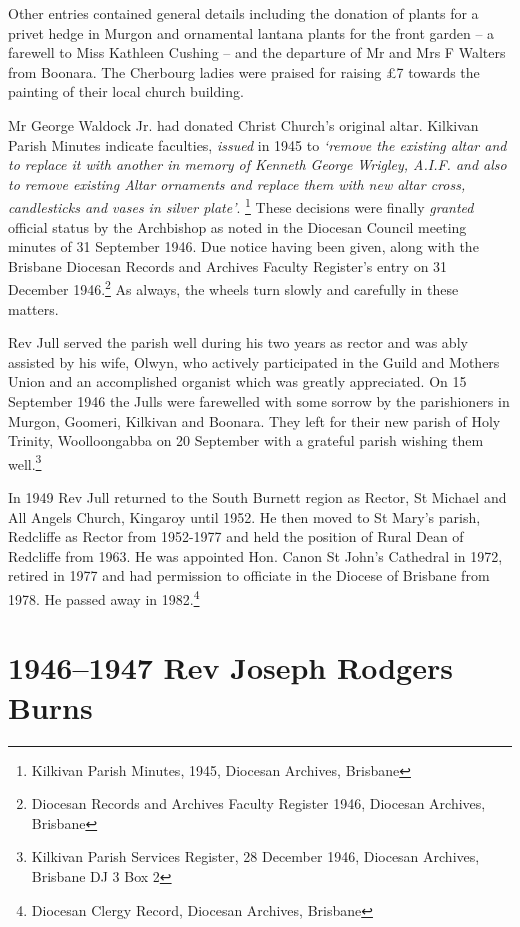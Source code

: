 Other entries contained general details including the donation of plants for a privet hedge in Murgon and ornamental lantana plants for the front garden -- a farewell to Miss Kathleen Cushing -- and the departure of Mr and Mrs F Walters from Boonara. The Cherbourg ladies were praised for raising £7 towards the painting of their local church building.

Mr George Waldock Jr. had donated Christ Church's original altar. Kilkivan Parish Minutes indicate faculties, \emph{issued} in 1945 to \emph{`remove the existing altar and to replace it with another in memory of Kenneth George Wrigley, A.I.F. and also to remove existing Altar ornaments and replace them with new altar cross, candlesticks and vases in silver plate'}. \footnote{Kilkivan Parish Minutes, 1945, Diocesan Archives, Brisbane} These decisions were finally \emph{granted} official status by the Archbishop as noted in the Diocesan Council meeting minutes of 31 September 1946. Due notice having been given, along with the Brisbane Diocesan Records and Archives Faculty Register's entry on 31 December 1946.\footnote{Diocesan Records and Archives Faculty Register 1946, Diocesan Archives, Brisbane} As always, the wheels turn slowly and carefully in these matters.

Rev Jull served the parish well during his two years as rector and was ably assisted by his wife, Olwyn, who actively participated in the Guild and Mothers Union and an accomplished organist which was greatly appreciated. On 15 September 1946 the Julls were farewelled with some sorrow by the parishioners in Murgon, Goomeri, Kilkivan and Boonara. They left for their new parish of Holy Trinity, Woolloongabba on 20 September with a grateful parish wishing them well.\footnote{Kilkivan Parish Services Register, 28 December 1946, Diocesan Archives, Brisbane DJ 3 Box 2}

In 1949 Rev Jull returned to the South Burnett region as Rector, St Michael and All Angels Church, Kingaroy until 1952. He then moved to St Mary's parish, Redcliffe as Rector from 1952-1977 and held the position of Rural Dean of Redcliffe from 1963. He was appointed Hon. Canon St John's Cathedral in 1972, retired in 1977 and had permission to officiate in the Diocese of Brisbane from 1978. He passed away in 1982.\footnote{Diocesan Clergy Record, Diocesan Archives, Brisbane}

\hypertarget{rev-joseph-rodgers-burns}{%
\section{1946--1947 Rev Joseph Rodgers Burns}\label{rev-joseph-rodgers-burns}}

